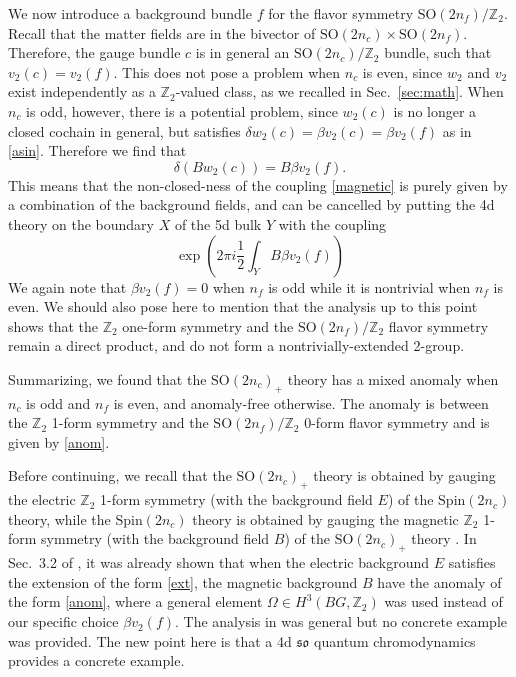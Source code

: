 \documentclass[12pt]{article}
\numberwithin{equation}{section}
\newcommand*{\bZ}{\mathbb{Z}}
\def\SO{\mathrm{SO}}
\def\so{\mathfrak{so}}
\def\Spin{\mathrm{Spin}}
\begin{document}
We now introduce a background bundle $f$  for the flavor symmetry $\SO(2n_f)/\bZ_2$.
Recall that the matter fields are in the bivector of $\SO(2n_c)\times \SO(2n_f)$.
Therefore, the gauge bundle $c$ is in general an $\SO(2n_c)/\bZ_2$ bundle, such that $v_2(c)=v_2(f)$.
This does not pose a problem when $n_c$ is even, since $w_2$ and $v_2$ exist independently as a $\bZ_2$-valued class, as we recalled in Sec.~\ref{sec:math}.
When $n_c$ is odd, however, there is a potential problem, since $w_2(c)$ is no longer a closed cochain in general, but satisfies $\delta w_2(c)=\beta v_2(c)=\beta v_2(f)$ as in \eqref{asin}.
Therefore we find that \begin{equation}
\delta (B w_2(c)) = B \beta v_2(f).
\end{equation}
This means that the non-closed-ness of the coupling \eqref{magnetic}
is purely given by a combination of the background fields,
and can be cancelled by putting the 4d theory on the boundary $X$ of the 5d bulk $Y$ with the coupling \begin{equation}
\exp\left(2\pi i \frac12 \int_Y B \beta v_2(f)\right)
\label{anom}
\end{equation}
We again note that $\beta v_2(f)=0$ when $n_f$ is odd while it is nontrivial when $n_f$ is even.
We should also pose here to mention that the analysis up to this point shows that
the $\bZ_2$ one-form symmetry and the $\SO(2n_f)/\bZ_2$ flavor symmetry remain a direct product,
and do not form a nontrivially-extended 2-group.

Summarizing, we found that the $\SO(2n_c)_+$ theory has a mixed anomaly when $n_c$ is odd and $n_f$ is even, and anomaly-free otherwise.
The anomaly is between the $\bZ_2$ 1-form symmetry and the $\SO(2n_f)/\bZ_2$ 0-form flavor symmetry  and is given by \eqref{anom}.

Before continuing, we recall that the $\SO(2n_c)_+$ theory is obtained by gauging the electric $\bZ_2$ 1-form symmetry (with the background field $E$) of the $\Spin(2n_c)$ theory,
while the $\Spin(2n_c)$ theory is obtained by gauging the magnetic $\bZ_2$ 1-form symmetry (with the background field $B$) of the $\SO(2n_c)_+$ theory \cite{Kapustin:2014gua}. 
In Sec.~3.2 of \cite{Tachikawa:2017gyf}, it was already shown that when the electric background $E$ satisfies the extension of the form \eqref{ext}, the magnetic background $B$ have the anomaly of the form \eqref{anom}, 
where a general element $\Omega\in H^3(BG,\bZ_2)$ was used instead of our specific choice $\beta v_2(f)$.
The analysis in \cite{Tachikawa:2017gyf} was general but no concrete example was provided.
The new point here is that a 4d $\so$ quantum chromodynamics provides a concrete example.
\end{document}
